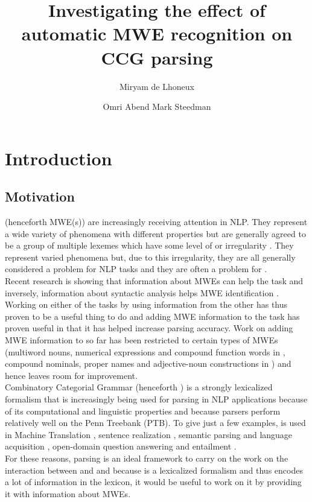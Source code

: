 \documentclass[output=paper]{langsci/langscibook}
\author{Miryam de Lhoneux\affiliation{Uppsala University}\and Omri Abend \affiliation{Hebrew University of Jerusalem}\lastand Mark Steedman \affiliation{University of Edinburgh}
}
\title{Investigating the effect of automatic MWE recognition on CCG parsing}
\begin{document}
\section{Introduction}
\label{del:introduction}

\subsection{Motivation}
\indent {} (henceforth MWE(s)) are increasingly receiving attention in NLP. They represent a wide variety of phenomena with different properties but are generally agreed to be a group of multiple lexemes which have some level of  or irregularity \citep{sag02}. They represent varied phenomena but, due to this irregularity, they are all generally considered a problem for NLP tasks and they are often a problem for . \\
\indent Recent research is showing that information about MWEs can help the  task \citep{nivre2004multiword,korkontzelosetal2010} and inversely, information about syntactic analysis helps MWE identification \citep{green13,weller&heid2010,martens&vandeghinste2010}. Working on either of the tasks by using information from the other has thus proven to be a useful thing to do and adding MWE information to the  task has proven useful in that it has helped increase parsing accuracy. Work on adding MWE information to  so far has been restricted to certain types of MWEs (multiword nouns, numerical expressions and compound function words in \citet{nivre2004multiword}, compound nominals, proper names and adjective-noun constructions in \citet{korkontzelosetal2010}) and hence leaves room for improvement.\\
\indent Combinatory Categorial Grammar (henceforth ) is a strongly lexicalized formalism that is increasingly being used for parsing in NLP applications because of its computational and linguistic properties and because  parsers perform relatively well on the Penn Treebank (PTB). To give just a few examples,  is used in Machine Translation \citep[e.g.][]{birch2007ccg}, sentence realization \citep[e.g][]{white2006efficient}, semantic parsing and language acquisition \citep[e.g.][]{krishnamurthy2012weakly}, open-domain question answering and entailment \citep[e.g.][]{lewis2013combining}.\\
\indent For these reasons,  parsing is an ideal framework to carry on the work on the interaction between  and  and because  is a lexicalized formalism and thus encodes a lot of information in the lexicon, it would be useful to work on it by providing it with information about MWEs. 
\end{document}
